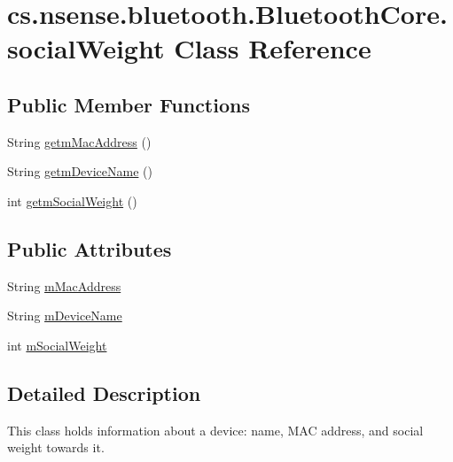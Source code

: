 \hypertarget{classcs_1_1nsense_1_1bluetooth_1_1_bluetooth_core_1_1social_weight}{\section{cs.\-nsense.\-bluetooth.\-Bluetooth\-Core.\-social\-Weight Class Reference}
\label{classcs_1_1nsense_1_1bluetooth_1_1_bluetooth_core_1_1social_weight}
}
\subsection*{Public Member Functions}
\begin{DoxyCompactItemize}
\item 
String \hyperlink{classcs_1_1nsense_1_1bluetooth_1_1_bluetooth_core_1_1social_weight_a8afeaa5cc829231dad8285efcfc8a3f8}{getm\-Mac\-Address} ()
\item 
String \hyperlink{classcs_1_1nsense_1_1bluetooth_1_1_bluetooth_core_1_1social_weight_ad22d5312b407893b387203c0b12817a8}{getm\-Device\-Name} ()
\item 
int \hyperlink{classcs_1_1nsense_1_1bluetooth_1_1_bluetooth_core_1_1social_weight_a72b610fa1ab36750cc5cc2ba67fd4e0f}{getm\-Social\-Weight} ()
\end{DoxyCompactItemize}
\subsection*{Public Attributes}
\begin{DoxyCompactItemize}
\item 
String \hyperlink{classcs_1_1nsense_1_1bluetooth_1_1_bluetooth_core_1_1social_weight_a5284a73386cab1ccb3148fed0570b58c}{m\-Mac\-Address}
\item 
String \hyperlink{classcs_1_1nsense_1_1bluetooth_1_1_bluetooth_core_1_1social_weight_aaf47801138c51e9779795c6fdd276319}{m\-Device\-Name}
\item 
int \hyperlink{classcs_1_1nsense_1_1bluetooth_1_1_bluetooth_core_1_1social_weight_af370031de2ab5a72911677a7d7211887}{m\-Social\-Weight}
\end{DoxyCompactItemize}


\subsection{Detailed Description}
This class holds information about a device\-: name, M\-A\-C address, and social weight towards it. 


